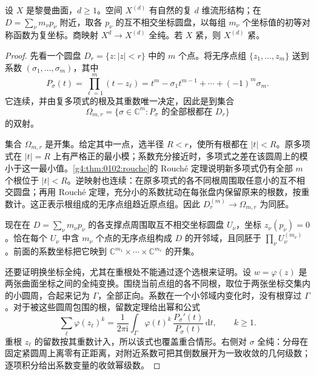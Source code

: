 \begin{theorem}
	\label{g4:thm:0402:symmetric-product}
	设 \(X\) 是黎曼曲面，\(d\ge1\)。空间 \(X^{(d)}\) 有自然的复 \(d\) 维流形结构；在 \(D=\sum_\nu m_\nu p_\nu\) 附近，取各 \(p_\nu\) 的互不相交坐标圆盘，以每组 \(m_\nu\) 个坐标值的初等对称函数为复坐标。商映射 \(X^d\to X^{(d)}\) 全纯。若 \(X\) 紧，则 \(X^{(d)}\) 紧。
\end{theorem}
\begin{proof}
	先看一个圆盘 \(D_r=\{z:|z|<r\}\) 中的 \(m\) 个点。将无序点组 \(\{z_1,\ldots,z_m\}\) 送到系数 \((\sigma_1,\ldots,\sigma_m)\)，其中
	\begin{equation}\label{g4:eq:0402:symmetric-polynomial}
		P_\sigma(t)=\prod_{\ell=1}^m(t-z_\ell)
		=t^m-\sigma_1t^{m-1}+\cdots+(-1)^m\sigma_m.
	\end{equation}
	它连续，并由复多项式的根及其重数唯一决定，因此是到集合
	\[
		\Omega_{m,r}=\{\sigma\in\mathbb C^m:
		P_\sigma\text{ 的全部根都在 }D_r\}
	\]
	的双射。

	集合 \(\Omega_{m,r}\) 是开集。给定其中一点，选半径 \(R<r\)，使所有根都在 \(|t|<R\)。原多项式在 \(|t|=R\) 上有严格正的最小模；系数充分接近时，多项式之差在该圆周上的模小于这一最小值。\cref{g4:thm:0102:rouche}的 Rouché 定理说明新多项式仍有全部 \(m\) 个根位于 \(|t|<R\)。逆映射也连续：在原多项式的各不同根周围取任意小的互不相交圆盘；再用 Rouché 定理，充分小的系数扰动在每张盘内保留原来的根数，按重数计。这正表示根组成的无序点组趋近原点组。因此 \(D_r^{(m)}\to\Omega_{m,r}\) 为同胚。

	现在在 \(D=\sum_\nu m_\nu p_\nu\) 的各支撑点周围取互不相交坐标圆盘 \(U_\nu\)，坐标 \(z_\nu(p_\nu)=0\)。恰在每个 \(U_\nu\) 中含 \(m_\nu\) 个点的无序点组构成 \(D\) 的开邻域，且同胚于 \(\prod_\nu U_\nu^{(m_\nu)}\)。前面的系数坐标把它映到 \(\mathbb C^{m_1}\times\cdots\times\mathbb C^{m_r}\) 的开集。

	还要证明换坐标全纯，尤其在重根处不能通过逐个选根来证明。设 \(w=\varphi(z)\) 是两张曲面坐标之间的全纯变换。围绕当前点组的各不同根，取位于两张坐标交集内的小圆周，合起来记为 \(\Gamma\)，全部正向。系数在一个小邻域内变化时，没有根穿过 \(\Gamma\)。对于被这些圆周包围的根，留数定理给出幂和公式
	\begin{equation}\label{g4:eq:0402:trace-integral}
		\sum_{\ell}\varphi(z_\ell)^k
		=\frac{1}{2\pi\mathrm{i}}\int_\Gamma
		\varphi(t)^k\,\frac{P_\sigma'(t)}{P_\sigma(t)}\,\mathrm{d}t,
		\qquad k\ge1.
	\end{equation}
	重根 \(z_\ell\) 的留数按其重数计入，所以该式也覆盖重合情形。右侧对 \(\sigma\) 全纯：分母在固定紧圆周上离零有正距离，对附近系数可把其倒数展开为一致收敛的几何级数；逐项积分给出系数变量的收敛幂级数。


\end{proof}
